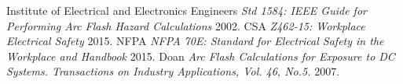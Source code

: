 
\begin{thebibliography}{1}

 Institute of Electrical and Electronics Engineers {\em Std 1584: IEEE Guide for Performing Arc Flash Hazard Calculations}  2002.
 CSA {\em Z462-15: Workplace Electrical Safety}  2015.
 NFPA {\em NFPA 70E: Standard for Electrical Safety in the Workplace and Handbook}  2015.
 Doan {\em Arc Flash Calculations for Exposure to DC Systems. Transactions on Industry Applications, Vol. 46, No.5.}  2007.

\end{thebibliography}